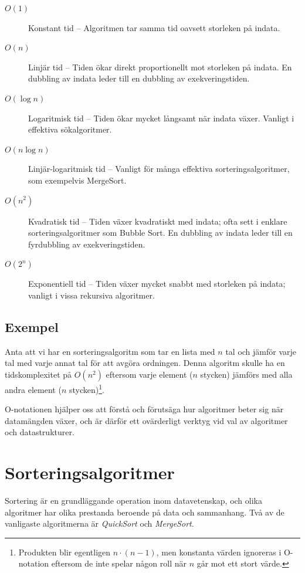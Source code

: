 \documentclass[a4paper,12pt]{article}   %
\begin{document}
\begin{description}
    \item[$O(1)$] Konstant tid -- Algoritmen tar samma tid oavsett storleken på indata.
    \item[$O(n)$] Linjär tid -- Tiden ökar direkt proportionellt mot storleken på indata. En dubbling av indata leder till en dubbling av exekveringstiden.
    \item[$O(\log n)$] Logaritmisk tid -- Tiden ökar mycket långsamt när indata växer. Vanligt i effektiva sökalgoritmer.
    \item[$O(n \log n)$] Linjär-logaritmisk tid -- Vanligt för många effektiva sorteringsalgoritmer, som exempelvis MergeSort.
    \item[$O(n^2)$] Kvadratisk tid -- Tiden växer kvadratiskt med indata; ofta sett i enklare sorteringsalgoritmer som Bubble Sort. En dubbling av indata leder till en fyrdubbling av exekveringstiden.
    \item[$O(2^n)$] Exponentiell tid -- Tiden växer mycket snabbt med storleken på indata; vanligt i vissa rekursiva algoritmer.
\end{description}

\subsection{Exempel}

Anta att vi har en sorteringsalgoritm som tar en lista med $n$ tal och jämför varje tal med varje annat tal för att avgöra ordningen. Denna algoritm skulle ha en tidskomplexitet på $O(n^2)$ eftersom varje element ($n$ stycken) jämförs med alla andra element ($n$ stycken)\footnote{Produkten blir egentligen $n\cdot(n-1)$, men konstanta värden ignoreras i O-notation eftersom de inte spelar någon roll när $n$ går mot ett stort värde.}.

O-notationen hjälper oss att förstå och förutsäga hur algoritmer beter sig när datamängden växer, och är därför ett ovärderligt verktyg vid val av algoritmer och datastrukturer.


\section{Sorteringsalgoritmer}

Sortering är en grundläggande operation inom datavetenskap, och olika algoritmer har olika prestanda beroende på data och sammanhang. Två av de vanligaste algoritmerna är \emph{QuickSort} och \emph{MergeSort}.
\end{document}
